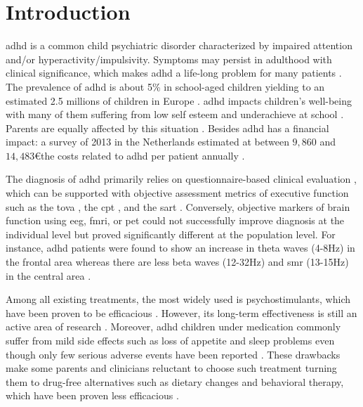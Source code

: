 

\section{Introduction} 

\gls{adhd} is a common child psychiatric disorder characterized by impaired attention and/or hyperactivity/impulsivity.
Symptoms may persist in adulthood with clinical significance, which makes \gls{adhd} a life-long problem for many
patients \citep{Faraone2006}. The prevalence of \gls{adhd} is about 5\% in school-aged children yielding to an estimated
2.5 millions of children in Europe \citep{DSM-5}. \gls{adhd} impacts children's well-being with many of them suffering
from low self esteem \citep{Shaw2005} and underachieve at school \citep{Barry2002}. Parents are equally affected by this
situation \citep{Harpin2005}. Besides \gls{adhd} has a financial impact: a survey of 2013 in the Netherlands estimated
at between $9,860$ and $14,483$\euro the costs related to \gls{adhd} per patient annually \citep{le2014}. 
 
The diagnosis of \gls{adhd} primarily relies on questionnaire-based clinical evaluation \citep{DSM-5}, which can be
supported with objective assessment metrics of executive function such as the \gls{tova} \citep{Forbes1998}, the
\gls{cpt} \citep{Barkley1991}, and the \gls{sart} \citep{Robertson1997}. Conversely, objective markers of brain function
using \gls{eeg}, \gls{fmri}, or \gls{pet} could not successfully improve diagnosis \citep{Neba} at the individual
level but proved significantly different at the population level.  For instance, \gls{adhd} patients were found to show
an increase in theta waves (4-8Hz) in the frontal area whereas there are less beta waves (12-32Hz) and \gls{smr}
(13-15Hz) in the central area \citep{Monastra2005, Matouvsek1984, Janzen1995,loo2017}.  
 
Among all existing treatments, the most widely used is psychostimulants, which have been proven to be efficacious
\citep{Taylor2014, Storebo2015}. However, its long-term effectiveness is still an active area of research
\citep{DuPaul1998, Swanson2001, Jensen1999}. Moreover, \gls{adhd} children under medication commonly suffer from mild
side effects such as loss of appetite and sleep problems even though only few serious adverse events have been reported
\citep{Storebo2015, Cooper2011}. These drawbacks make some parents and clinicians reluctant to choose such treatment
turning them to drug-free alternatives such as dietary changes \citep{Belanger2009} and behavioral therapy, which have
been proven less efficacious \citep{Sonuga-Barke2013}.


